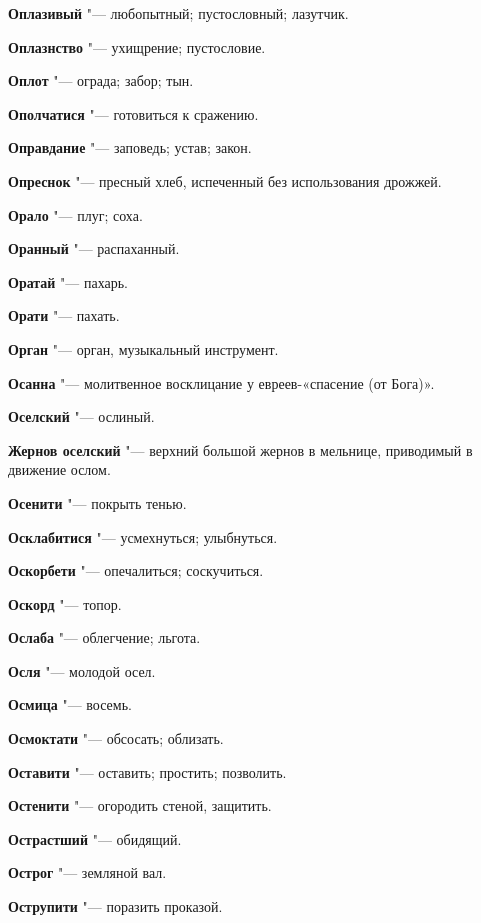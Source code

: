 \begin{mymulticols}
\noindent\textbf{Оплазивый} "--- любопытный; пустословный; лазутчик. 

\noindent\textbf{Оплазнство} "--- ухищрение; пустословие. 

\noindent\textbf{Оплот} "--- ограда; забор; тын. 

\noindent\textbf{Ополчатися} "--- готовиться к сражению. 

\noindent\textbf{Оправдание} "--- заповедь; устав; закон. 

\noindent\textbf{Опреснок} "--- пресный хлеб, испеченный без использования дрожжей. 

\noindent\textbf{Орало} "--- плуг; соха. 

\noindent\textbf{Оранный} "--- распаханный. 

\noindent\textbf{Оратай} "--- пахарь. 

\noindent\textbf{Орати} "--- пахать. 

\noindent\textbf{Орган} "--- орган, музыкальный инструмент. 

\noindent\textbf{Осанна} "--- молитвенное восклицание у евреев-«спасение (от Бога)». 

\noindent\textbf{Оселский} "--- ослиный. 

\noindent\textbf{Жернов оселский} "--- верхний большой жернов в мельнице, приводимый в движение ослом. 

\noindent\textbf{Осенити} "--- покрыть тенью. 

\noindent\textbf{Осклабитися} "--- усмехнуться; улыбнуться. 

\noindent\textbf{Оскорбети} "--- опечалиться; соскучиться. 

\noindent\textbf{Оскорд} "--- топор. 

\noindent\textbf{Ослаба} "--- облегчение; льгота. 

\noindent\textbf{Осля} "--- молодой осел. 

\noindent\textbf{Осмица} "--- восемь. 

\noindent\textbf{Осмоктати} "--- обсосать; облизать. 

\noindent\textbf{Оставити} "--- оставить; простить; позволить. 

\noindent\textbf{Остенити} "--- огородить стеной, защитить. 

\noindent\textbf{Острастший} "--- обидящий. 

\noindent\textbf{Острог} "--- земляной вал. 

\noindent\textbf{Острупити} "--- поразить проказой. 


\end{mymulticols}
